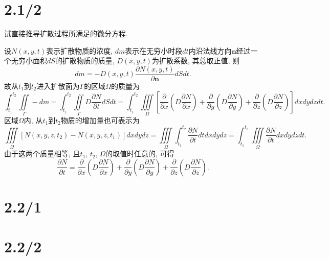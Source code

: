 \documentclass[11pt,a4paper]{article}
\begin{document}
\section{2.1/2}
\begin{problem}
试直接推导扩散过程所满足的微分方程.
\end{problem}
设$N(x,y,t)$表示扩散物质的浓度, $dm$表示在无穷小时段$dt$内沿法线方向$\mathbf{n}$经过一个无穷小面积$dS$的扩散物质的质量, $D(x,y,t)$为扩散系数, 其总取正值, 则
$$dm=-D(x,y,t)\frac{\partial N(x,y,t)}{\partial \mathbf{n}}dSdt.$$
故从$t_1$到$t_2$进入扩散面为$\Gamma$的区域$\Omega$的质量为
$$\int_{t_1}^{t_2}\iint\limits_{\Gamma}-dm=\int_{t_1}^{t_2}\iint\limits_{\Gamma}D\frac{\partial N}{\partial t}dSdt=\int_{t_1}^{t_2}\iiint\limits_{\Omega}\left[\frac{\partial}{\partial x}\left(D\frac{\partial N}{\partial x}\right)+\frac{\partial}{\partial y}\left(D\frac{\partial N}{\partial y}\right)+\frac{\partial}{\partial z}\left(D\frac{\partial N}{\partial z}\right)\right]dxdydzdt.$$
区域$\Omega$内, 从$t_1$到$t_2$物质的增加量也可表示为
$$\iiint\limits_{\Omega}\left[N(x,y,z,t_2)-N(x,y,z,t_1)\right]dxdydz=\iiint\limits_{\Omega}\int_{t_1}^{t_2}\frac{\partial N}{\partial t}dtdxdydz=\int_{t_1}^{t_2}\iiint\limits_{\Omega}\frac{\partial N}{\partial t}dxdydzdt.$$
由于这两个质量相等, 且$t_1$, $t_2$, $\Omega$的取值时任意的, 可得
$$\frac{\partial N}{\partial t}=\frac{\partial}{\partial x}\left(D\frac{\partial N}{\partial x}\right)+\frac{\partial}{\partial y}\left(D\frac{\partial N}{\partial y}\right)+\frac{\partial}{\partial z}\left(D\frac{\partial N}{\partial z}\right).$$

\section{2.2/1}

\section{2.2/2}
\end{document}
